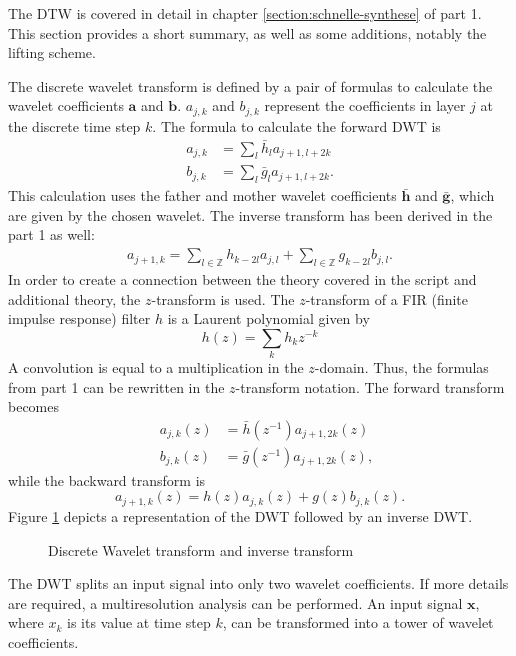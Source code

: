 \begin{refsection}
The DTW is covered in detail in chapter \ref{section:schnelle-synthese} of part 1.
This section provides a short summary, as well as some additions, notably the lifting scheme.

The discrete wavelet transform is defined by a pair of formulas to calculate the wavelet coefficients $\bm a$ and $\bm b$.
$a_{j,k}$ and $b_{j,k}$ represent the coefficients in layer $j$ at the discrete time step $k$.
The formula to calculate the forward DWT is
\begin{align}
a_{j,k} &= \sum_{l} \bar{h}_l a_{j+1,l+2k}
\\
b_{j,k} &= \sum_{l} \bar{g}_l a_{j+1,l+2k} .
\end{align}
This calculation uses the father and mother wavelet coefficients $\bm{\bar h}$ and $\bm{\bar g}$, which are given by the chosen wavelet.
The inverse transform has been derived in the part 1 as well: 
\begin{align}
a_{j+1,k} =
\sum_{l\in\mathbb Z}
h_{k-2l}
a_{j,l}
+
\sum_{l\in\mathbb Z}
g_{k-2l}
b_{j,l} .
\end{align}
In order to create a connection between the theory covered in the script and additional theory, the $z$-transform is used.
The $z$-transform of a FIR (finite impulse response) filter $h$ is a Laurent polynomial given by
\begin{equation}
h(z) = \sum_{k} h_k z^{-k}
\end{equation}
A convolution is equal to a multiplication in the $z$-domain.
Thus, the formulas from part 1 can be rewritten in the $z$-transform notation.
The forward transform becomes
\begin{align}
\quad a_{j,k}(z) &= \bar h(z^{-1}) a_{j+1,2k}(z) 
\\
\quad b_{j,k}(z) &= \bar g(z^{-1}) a_{j+1,2k}(z),
\end{align}
while the backward transform is
\begin{equation}
a_{j+1,k}(z) = h(z) a_{j,k}(z) + g(z) b_{j,k}(z).
\end{equation}
Figure \ref{fpga:fig:dwt} depicts a representation of the DWT followed by an inverse DWT.
\begin{figure}
	\centering
	
	\caption{Discrete Wavelet transform and inverse transform}
	\label{fpga:fig:dwt}
\end{figure}
The DWT splits an input signal into only two wavelet coefficients.
If more details are required, a multiresolution analysis can be performed.
An input signal $\bm x$, where $x_k$ is its value at time step $k$, can be transformed into a tower of wavelet coefficients.

\end{refsection}
